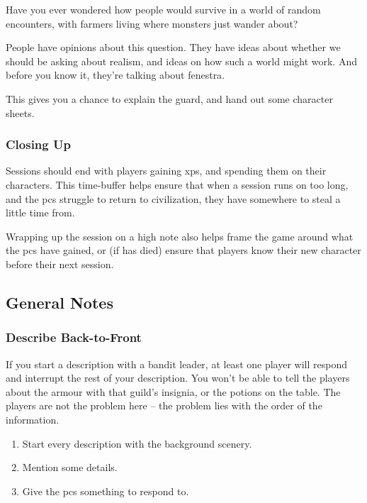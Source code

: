 \begin{multicols}{2}
\begin{speechtext}
  Have you ever wondered how people would survive in a world of random encounters, with farmers living where monsters just wander about?
\end{speechtext}

People have opinions about this question.
They have ideas about whether we should be asking about realism, and ideas on how such a world might work.
And before you know it, they're talking about \gls{fenestra}.

This gives you a chance to explain the \gls{guard}, and hand out some character sheets.

\subsubsection{Closing Up}

Sessions should end with players gaining \glspl{xp}, and spending them on their characters.
This time-buffer helps ensure that when a session runs on too long, and the \glspl{pc} struggle to return to civilization, they have somewhere to steal a little time from.

Wrapping up the session on a high note also helps frame the game around what the \glspl{pc} have gained, or (if  has died) ensure that players know their new character before their next session.

\subsection{General Notes}

\subsubsection{Describe Back-to-Front}

If you start a description with a bandit leader, at least one player will respond and interrupt the rest of your description.
You won't be able to tell the players about the armour with that guild's insignia, or the potions on the table.
The players are not the problem here -- the problem lies with the order of the information.

\begin{enumerate}
  \item
  Start every description with the background scenery.
  \item
  Mention some details.
  \item
  Give the \glspl{pc} something to respond to.
\end{enumerate}


\end{multicols}
